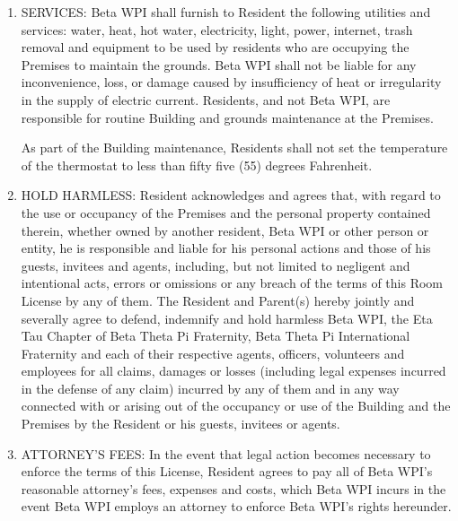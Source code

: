 \documentclass[legalpaper, 12pt]{article}
\begin{document}
\begin{enumerate}
        \item\label{itm:services} SERVICES\@: Beta WPI shall furnish to
                Resident the following utilities and services: water, heat, hot
                water, electricity, light, power, internet, trash removal and
                equipment to be used by residents who are occupying the
                Premises to maintain the grounds.  Beta WPI shall not be liable
                for any inconvenience, loss, or damage caused by insufficiency
                of heat or irregularity in the supply of electric current.
                Residents, and not Beta WPI, are responsible for routine
                Building and grounds maintenance at the Premises.

                As part of the Building maintenance, Residents shall not set
                the temperature of the thermostat to less than fifty five (55)
                degrees Fahrenheit.

        \item\label{itm:holdharm} HOLD HARMLESS\@: Resident acknowledges and
                agrees that, with regard to the use or occupancy of the
                Premises and the personal property contained therein, whether
                owned by another resident, Beta WPI or other person or entity,
                he is responsible and liable for his personal actions and those
                of his guests, invitees and agents, including, but not limited
                to negligent and intentional acts, errors or omissions or any
                breach of the terms of this Room License by any of them.  The
                Resident and Parent(s) hereby jointly and severally agree to
                defend, indemnify and hold harmless Beta WPI, the Eta Tau
                Chapter of Beta Theta Pi Fraternity, Beta Theta Pi
                International Fraternity and each of their respective agents,
                officers, volunteers and employees for all claims, damages or
                losses (including legal expenses incurred in the defense of any
                claim) incurred by any of them and in any way connected with or
                arising out of the occupancy or use of the Building and the
                Premises by the Resident or his guests, invitees or agents.

        \item\label{itm:attorney} ATTORNEY'S FEES\@: In the event that legal
                action becomes necessary to enforce the terms of this License,
                Resident agrees to pay all of Beta WPI’s reasonable attorney’s
                fees, expenses and costs, which Beta WPI incurs in the event
                Beta WPI employs an attorney to enforce Beta WPI’s rights
                hereunder.


\end{enumerate}
\end{document}
